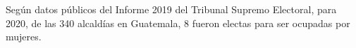 Según datos públicos del Informe 2019 del Tribunal Supremo Electoral, para 2020, de las 340 alcaldías en Guatemala, 8 fueron electas para ser ocupadas por mujeres. 